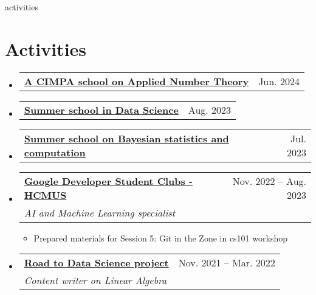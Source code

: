 \documentclass[letterpaper,11pt]{article}
\makeatletter
\newcommand{\heading}[4]{
    \normalsize
    \begin{tabular*}{0.97\textwidth}[t]{l@{\extracolsep{\fill}}r}
      \textbf{#1} & #2 \\[-2pt]
      \textit{\small#3} & \textit{\small #4}
    \end{tabular*}
    \vspace{-2pt}
}
\newcommand{\subheading}[2]{
    \normalsize
    \begin{tabular*}{0.97\textwidth}[t]{l@{\extracolsep{\fill}}r}
      \textbf{#1} & #2 \\
    \end{tabular*}
    \vspace{-2pt}
}
\makeatother
\begin{document}
\begin{filecontents*}[overwrite]{activities}
    \section{Activities}
    \begin{itemize}
        
        \item \subheading{\href{http://www.rnta.eu/HCMC2024/index.html}{A CIMPA school on Applied Number Theory \faExternalLink}}{Jun. 2024}
        
        
        \item \subheading{\href{https://viasm.edu.vn/hdkh/ssds2023}{Summer school in Data Science \faExternalLink}}{Aug. 2023}
        
        \item \subheading{\href{https://viasm.edu.vn/hdkh/somsaml}{Summer school on Bayesian statistics and computation \faExternalLink}}{Jul. 2023}
    
        \item \heading{\href{https://www.facebook.com/gdgoc.hcmus}{Google Developer Student Clubs - HCMUS \faExternalLink}}{Nov. 2022 -- Aug. 2023}{AI and Machine Learning specialist}{}
            \begin{itemize}
                \item Prepared materials for Session 5: Git in the Zone in cs101 workshop
            \end{itemize}
        
        \item \heading{\href{https://www.facebook.com/RDSproject/}{Road to Data Science project \faExternalLink}}{Nov. 2021 -- Mar. 2022}{Content writer on Linear Algebra}{}
    \end{itemize}
\end{filecontents*}
\end{document}
